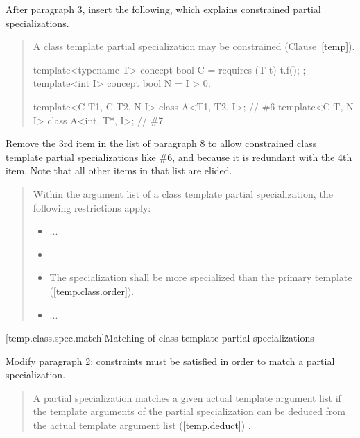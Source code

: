 After paragraph 3, insert the following, which explains constrained partial 
specializations.

\begin{quote}
\begin{addedblock}
\setcounter{Paras}{3}
\pnum
A class template partial specialization may be constrained
(Clause~\ref{temp}).
\enterexample
\begin{codeblock}
template<typename T> concept bool C = requires (T t) { t.f(); };
template<int I> concept bool N = I > 0;

template<C T1, C T2, N I> class A<T1, T2, I>;  // \#6
template<C T, N I>        class A<int, T*, I>; // \#7
\end{codeblock}
\exitexample
\end{addedblock}
\end{quote}

Remove the 3rd item in the list of paragraph 8 to allow constrained class 
template partial specializations like \#6, and because it is redundant with 
the 4th item. Note that all other items in that list are elided.

\begin{quote}
\setcounter{Paras}{7}
Within the argument list of a class template partial specialization, 
the following restrictions apply:
\begin{itemize}
\item ...

\item {}

\item The specialization shall be more specialized than the primary
template (\ref{temp.class.order}).

\item ...
\end{itemize}
\end{quote}
 
[temp.class.spec.match]{Matching of class template partial specializations}

Modify paragraph 2; constraints must be satisfied in order
to match a partial specialization. 

\begin{quote}
\setcounter{Paras}{1}
\pnum
A partial specialization matches a given actual template argument list if 
the template arguments of the partial specialization can be deduced from the 
actual template argument list (\ref{temp.deduct}) .
\end{quote}

